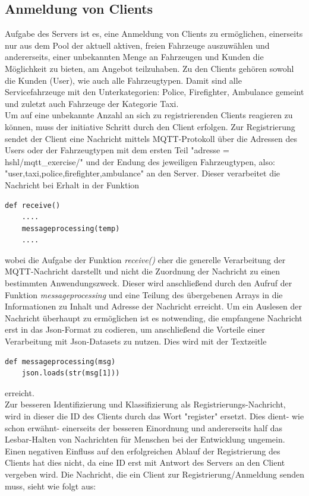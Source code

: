 \subsection{Anmeldung von Clients}
Aufgabe des Servers ist es, eine Anmeldung von Clients zu ermöglichen, einerseits nur aus dem Pool der aktuell aktiven, freien Fahrzeuge auszuwählen und  andererseits, einer unbekannten Menge an Fahrzeugen und Kunden die Möglichkeit zu bieten, am Angebot teilzuhaben. Zu den Clients gehören sowohl die Kunden (User), wie auch alle Fahrzeugtypen. Damit sind alle Servicefahrzeuge mit den Unterkategorien: Police, Firefighter, Ambulance gemeint und zuletzt auch Fahrzeuge der Kategorie Taxi.\\ Um auf eine unbekannte Anzahl an sich zu registrierenden Clients reagieren zu können, muss der initiative Schritt durch den Client erfolgen. Zur Registrierung sendet der Client eine Nachricht mittels MQTT-Protokoll über die Adressen des Users oder der Fahrzeugtypen mit dem ersten Teil \textsf{"adresse = hshl/mqtt\_exercise/"} und der Endung des jeweiligen Fahrzeugtypen, also: \textsf{"user,taxi,police,firefighter,ambulance"} an den Server. Dieser verarbeitet die Nachricht bei Erhalt in der Funktion\begin{lstlisting}
def receive()
	....
	messageprocessing(temp)
	....
\end{lstlisting}
 wobei die Aufgabe der Funktion \textit{receive()} eher die generelle Verarbeitung der MQTT-Nachricht darstellt und nicht die Zuordnung der Nachricht zu einen bestimmten Anwendungszweck.
Dieser wird anschließend durch den Aufruf der Funktion \textit{messageprocessing} und eine Teilung des übergebenen Arrays in die Informationen zu Inhalt und Adresse der Nachricht erreicht.
Um ein Auslesen der Nachricht überhaupt zu ermöglichen ist es notwending, die empfangene Nachricht erst in das Json-Format zu codieren, um anschließend die Vorteile einer Verarbeitung mit Json-Datasets zu nutzen. Dies wird mit der Textzeitle \begin{lstlisting}
def messageprocessing(msg)
	json.loads(str(msg[1]))
\end{lstlisting}
 erreicht.\\
 Zur besseren Identifizierung und Klassifizierung als Registrierungs-Nachricht, wird in dieser die ID des Clients durch das Wort "register" ersetzt. Dies dient- wie schon erwähnt- einerseits der besseren Einordnung und andererseits half das Lesbar-Halten von Nachrichten für Menschen bei der Entwicklung ungemein. Einen negativen Einfluss auf den erfolgreichen Ablauf der Registrierung des Clients hat dies nicht, da eine ID erst mit Antwort des Servers an den Client vergeben wird. Die Nachricht, die ein Client zur Registrierung/Anmeldung senden muss, sieht wie folgt aus:
